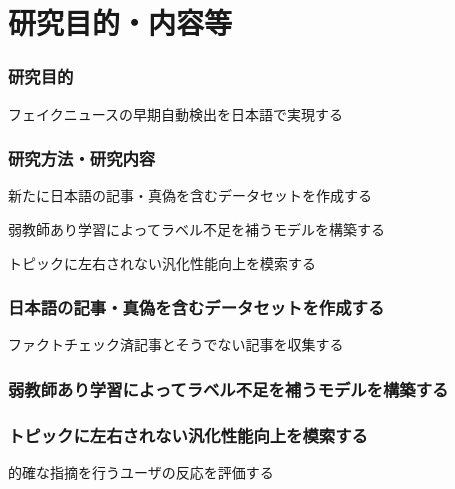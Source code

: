 
\section{研究目的・内容等}

\subsubsection*{研究目的}
フェイクニュースの早期自動検出を日本語で実現する

\subsubsection*{研究方法・研究内容}
新たに日本語の記事・真偽を含むデータセットを作成する

弱教師あり学習によってラベル不足を補うモデルを構築する

トピックに左右されない汎化性能向上を模索する


\subsubsection*{日本語の記事・真偽を含むデータセットを作成する}
ファクトチェック済記事とそうでない記事を収集する

\subsubsection*{弱教師あり学習によってラベル不足を補うモデルを構築する}


\subsubsection*{トピックに左右されない汎化性能向上を模索する}
的確な指摘を行うユーザの反応を評価する


